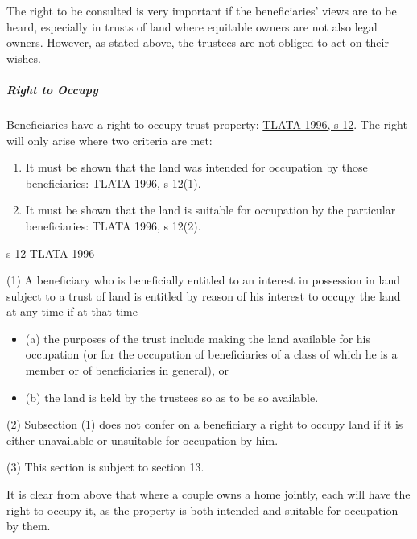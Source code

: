 \documentclass[
]{article}
\providecommand{\tightlist}{%
  \setlength{\itemsep}{0pt}\setlength{\parskip}{0pt}}
\newenvironment{env-9843ce55-0506-497d-95ba-03a690b05b3c}
{
    \savenotes\tcolorbox[blanker,breakable,left=5pt,borderline west={2pt}{-4pt}{green}]
}
{
    \endtcolorbox\spewnotes
}
\begin{document}
The right to be consulted is very important if the beneficiaries' views
are to be heard, especially in trusts of land where equitable owners are
not also legal owners. However, as stated above, the trustees are not
obliged to act on their wishes.

\hypertarget{right-to-occupy}{%
\subparagraph{Right to Occupy}\label{right-to-occupy}}

Beneficiaries have a right to occupy trust property:
\href{https://www.legislation.gov.uk/ukpga/1996/47/section/12}{TLATA
1996, s 12}. The right will only arise where two criteria are met:

\begin{enumerate}
\tightlist
\item
  It must be shown that the land was intended for occupation by those
  beneficiaries: TLATA 1996, s 12(1).
\item
  It must be shown that the land is suitable for occupation by the
  particular beneficiaries: TLATA 1996, s 12(2).
\end{enumerate}

\begin{env-9843ce55-0506-497d-95ba-03a690b05b3c}

s 12 TLATA 1996

(1) A beneficiary who is beneficially entitled to an interest in
possession in land subject to a trust of land is entitled by reason of
his interest to occupy the land at any time if at that time---

\begin{itemize}
\item
  (a) the purposes of the trust include making the land available for
  his occupation (or for the occupation of beneficiaries of a class of
  which he is a member or of beneficiaries in general), or
\item
  (b) the land is held by the trustees so as to be so available.
\end{itemize}

(2) Subsection (1) does not confer on a beneficiary a right to occupy
land if it is either unavailable or unsuitable for occupation by him.

(3) This section is subject to section 13.

\end{env-9843ce55-0506-497d-95ba-03a690b05b3c}

It is clear from above that where a couple owns a home jointly, each
will have the right to occupy it, as the property is both intended and
suitable for occupation by them.
\end{document}
